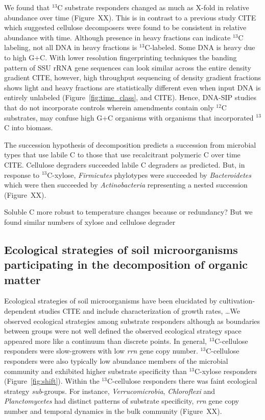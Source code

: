 We found that $^{13}$C substrate responders changed as much as X-fold in
relative abundance over time (Figure~XX). This is in contrast to
a previous study CITE which suggested cellulose decomposers were found to
be consistent in relative abundance with time. Although presence in heavy
fractions can indicate $^{13}$C labeling, not all DNA in heavy fractions
is $^{13}$C-labeled. Some DNA is heavy due to high G+C.
With lower resolution fingerprinting techniques the banding pattern of SSU
rRNA gene sequences can look similar across the entire density gradient
CITE, however, high throughput sequencing of density gradient fractions
shows light and heavy fractions are statistically different even when
input DNA is entirely unlabeled (Figure~\ref{fig:time_class}, and CITE).
Hence, DNA-SIP studies that do not incorporate controls wherein amendments
contain only $^{12}$C substrates, may confuse high G+C organisms with
organisms that incorporated $^{13}$C into biomass. 

The succession hypothesis of decomposition predicts a succession from
microbial types that use labile C to those that use recalcitrant polymeric
C over time CITE. Cellulose degraders succeeded labile C degraders as
predicted. But, in response to $^{13}$C-xylose,  \textit{Firmicutes}
phylotypes were succeeded by \textit{Bacteroidetes} which were then
succeeded by \textit{Actinobacteria} representing a nested succession
(Figure~XX). 

Soluble C more robust to temperature changes because or redundancy? But we
found similar numbers of xylose and cellulose degrader
\subsection{Ecological strategies of soil microorganisms participating in the
    decomposition of organic matter}
\label{sub:ecological_strategies}
Ecological strategies of soil microorganisms have been elucidated by
cultivation-dependent studies CITE and include characterization of growth
rates, \ldots  We observed ecological strategies among substrate
responders although as boundaries between groups were not well defined the
observed ecological strategy space appeared more like a continuum than discrete
points. In general, $^{13}$C-cellulose responders were slow-growers with low
\textit{rrn} gene copy number. $^{13}$C-cellulose responders were also
typically low abundance members of the microbial community and exhibited higher
substrate specificity than $^{13}$C-xylose responders (Figure~\ref{fig:shift}).
Within the $^{13}$C-cellulose responders there was faint 
ecological strategy \textit{sub}-groups. For instance,
\textit{Verrucomicrobia}, \textit{Chloroflexi} and \textit{Planctomycetes} had
distinct patterns of substrate specificity, \textit{rrn} gene copy number and
temporal dynamics in the bulk community (Figure~XX).


